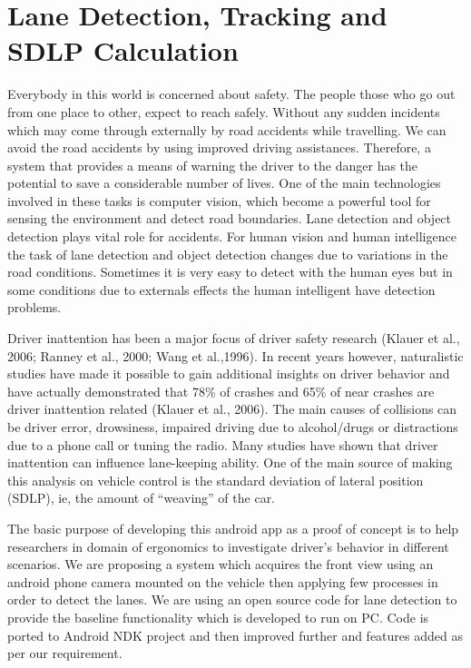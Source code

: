 \chapter{Lane Detection, Tracking and SDLP Calculation}  \label{kap:sdlp}

Everybody in this world is concerned about safety. The people those who go out from
one place to other, expect to reach safely. Without any sudden incidents which may come 
through externally by road accidents while travelling. We can avoid the road accidents by 
using improved driving assistances. Therefore, a system that provides a means of warning 
the driver to the danger has the potential to save a considerable number of lives. One of the 
main technologies involved in these tasks is computer vision, which become a powerful tool for 
sensing the environment and detect road boundaries. Lane detection and object detection plays 
vital role for accidents. For human vision and human intelligence the task of lane detection and 
object detection changes due to variations in the road conditions. Sometimes it is very easy to 
detect with the human eyes but in some conditions due to externals effects the human intelligent 
have detection problems. 

Driver inattention has been a major focus of driver safety research (Klauer et al., 2006; 
Ranney et al., 2000; Wang et al.,1996). In recent years however, naturalistic studies have made 
it possible to gain additional insights on driver behavior and have actually demonstrated that 
78\% of crashes and 65\% of near crashes are driver inattention related (Klauer et al., 2006). The 
main causes of collisions can be driver error, drowsiness, impaired driving due to alcohol/drugs 
or distractions due to a phone call or tuning the radio. Many studies have shown that driver 
inattention can influence lane-keeping ability. One of the main source of making this analysis on 
vehicle control is the standard deviation of lateral position (SDLP), ie, the
amount of ``weaving''
of the car.

The basic purpose of developing this android app as a proof of concept is to help
researchers in domain of ergonomics to investigate driver's behavior in different scenarios. We 
are proposing a system which acquires the front view using an android phone camera mounted 
on the vehicle then applying few processes in order to detect the lanes. We are using an open 
source code for lane detection \cite{lane-code} to provide the baseline functionality which is developed to run 
on PC. Code is ported to Android NDK project and then improved further and features added as 
per our requirement.

